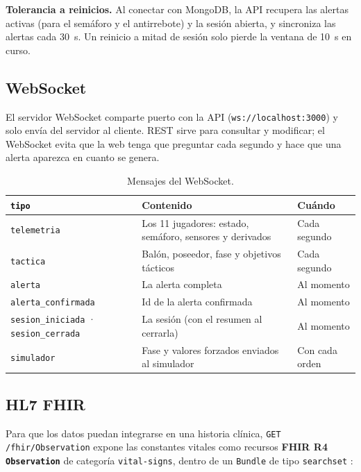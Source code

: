 \documentclass[runningheads]{llncs}
\begin{document}
\textbf{Tolerancia a reinicios.} Al conectar con MongoDB, la API recupera las alertas activas (para el semáforo y el antirrebote) y la sesión abierta, y sincroniza las alertas cada 30~s. Un reinicio a mitad de sesión solo pierde la ventana de 10~s en curso.

\subsection{WebSocket}

El servidor WebSocket comparte puerto con la API (\texttt{ws://localhost:3000}) y solo envía del servidor al cliente. REST sirve para consultar y modificar; el WebSocket evita que la web tenga que preguntar cada segundo y hace que una alerta aparezca en cuanto se genera.

\begin{table}[!htbp]
\centering
\caption{Mensajes del WebSocket.}\label{tab:ws}
\footnotesize
\begin{tabularx}{\textwidth}{p{4cm}Lp{2cm}}
\toprule
\textbf{\texttt{tipo}} & \textbf{Contenido} & \textbf{Cuándo} \\
\midrule
\texttt{telemetria} & Los 11 jugadores: estado, semáforo, sensores y derivados & Cada segundo \\
\texttt{tactica} & Balón, poseedor, fase y objetivos tácticos & Cada segundo \\
\texttt{alerta} & La alerta completa & Al momento \\
\texttt{alerta\_confirmada} & Id de la alerta confirmada & Al momento \\
\texttt{sesion\_iniciada} · \texttt{sesion\_cerrada} & La sesión (con el resumen al cerrarla) & Al momento \\
\texttt{simulador} & Fase y valores forzados enviados al simulador & Con cada orden \\
\bottomrule
\end{tabularx}
\end{table}

\subsection{HL7 FHIR}

Para que los datos puedan integrarse en una historia clínica, \texttt{GET /fhir/Observation} expone las constantes vitales como recursos \textbf{FHIR R4 \texttt{Observation}} de categoría \texttt{vital-signs}, dentro de un \texttt{Bundle} de tipo \texttt{searchset} \cite{fhir}:
\end{document}

